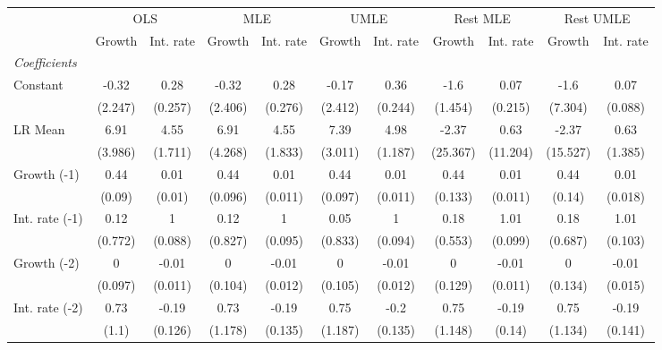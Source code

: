 \begin{table}[htbp] 
	\centering
	\begin{tabular}{@{\extracolsep{4pt}}lcccccccccc@{}}		\hline\hline
		 		 & \multicolumn{2}{c}{OLS} &\multicolumn{2}{c}{MLE} &\multicolumn{2}{c}{UMLE} &\multicolumn{2}{c}{Rest MLE} &\multicolumn{2}{c}{Rest UMLE} \\ 
 		 & Growth 	 & Int. rate 	 & Growth 	 & Int. rate 	 & Growth 	 & Int. rate 	 & Growth 	 & Int. rate 	 & Growth 	 & Int. rate\\\cline{2-3}\cline{4-5}\cline{6-7}\cline{8-9}\cline{10-11}
\rule{0pt}{4ex} 
 \emph{Coefficients} 	  		 & 		 & 		 & 		 & 		 & 		 & 		 & 		 & 		 & 		 &\\ 
\quad Constant 	 & -0.32 	 & 0.28 	 & -0.32 	 & 0.28 	 & -0.17 	 & 0.36 	 & -1.6 	 & 0.07 	 & -1.6 	 & 0.07	 \\ 
 		 & (2.247) 	 & (0.257) 	 & (2.406) 	 & (0.276) 	 & (2.412) 	 & (0.244) 	 & (1.454) 	 & (0.215) 	 & (7.304) 	 & (0.088) 	 \\ 
\quad LR Mean 	 & 6.91 	 & 4.55 	 & 6.91 	 & 4.55 	 & 7.39 	 & 4.98 	 & -2.37 	 & 0.63 	 & -2.37 	 & 0.63	 \\ 
 		 & (3.986) 	 & (1.711) 	 & (4.268) 	 & (1.833) 	 & (3.011) 	 & (1.187) 	 & (25.367) 	 & (11.204) 	 & (15.527) 	 & (1.385) 	 \\ 
\quad Growth (-1) 	 &0.44 	 & 0.01 	 & 0.44 	 & 0.01 	 & 0.44 	 & 0.01 	 & 0.44 	 & 0.01 	 & 0.44 	 & 0.01	 \\ 
 		 & (0.09) 	 & (0.01) 	 & (0.096) 	 & (0.011) 	 & (0.097) 	 & (0.011) 	 & (0.133) 	 & (0.011) 	 & (0.14) 	 & (0.018) 	 \\ 
\quad Int. rate (-1) 	 &0.12 	 & 1 	 & 0.12 	 & 1 	 & 0.05 	 & 1 	 & 0.18 	 & 1.01 	 & 0.18 	 & 1.01	 \\ 
 		 & (0.772) 	 & (0.088) 	 & (0.827) 	 & (0.095) 	 & (0.833) 	 & (0.094) 	 & (0.553) 	 & (0.099) 	 & (0.687) 	 & (0.103) 	 \\ 
\quad Growth (-2) 	 &0 	 & -0.01 	 & 0 	 & -0.01 	 & 0 	 & -0.01 	 & 0 	 & -0.01 	 & 0 	 & -0.01	 \\ 
 		 & (0.097) 	 & (0.011) 	 & (0.104) 	 & (0.012) 	 & (0.105) 	 & (0.012) 	 & (0.129) 	 & (0.011) 	 & (0.134) 	 & (0.015) 	 \\ 
\quad Int. rate (-2) 	 &0.73 	 & -0.19 	 & 0.73 	 & -0.19 	 & 0.75 	 & -0.2 	 & 0.75 	 & -0.19 	 & 0.75 	 & -0.19	 \\ 
 		 & (1.1) 	 & (0.126) 	 & (1.178) 	 & (0.135) 	 & (1.187) 	 & (0.135) 	 & (1.148) 	 & (0.14) 	 & (1.134) 	 & (0.141) 	 \\ 

\end{tabular}
\end{table}
